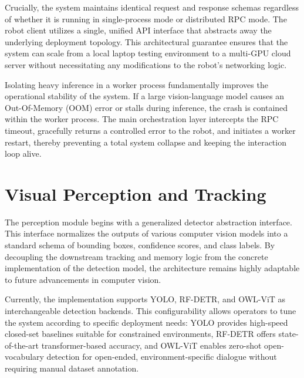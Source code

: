 Crucially, the system maintains identical request and response schemas regardless of whether it is running in single-process mode or distributed RPC mode. The robot client utilizes a single, unified API interface that abstracts away the underlying deployment topology. This architectural guarantee ensures that the system can scale from a local laptop testing environment to a multi-GPU cloud server without necessitating any modifications to the robot's networking logic.

Isolating heavy inference in a worker process fundamentally improves the operational stability of the system. If a large vision-language model causes an Out-Of-Memory (OOM) error or stalls during inference, the crash is contained within the worker process. The main orchestration layer intercepts the RPC timeout, gracefully returns a controlled error to the robot, and initiates a worker restart, thereby preventing a total system collapse and keeping the interaction loop alive.

\section{Visual Perception and Tracking}
\label{sec:perception_tracking}

The perception module begins with a generalized detector abstraction interface. This interface normalizes the outputs of various computer vision models into a standard schema of bounding boxes, confidence scores, and class labels. By decoupling the downstream tracking and memory logic from the concrete implementation of the detection model, the architecture remains highly adaptable to future advancements in computer vision.

Currently, the implementation supports YOLO, RF-DETR, and OWL-ViT as interchangeable detection backends. This configurability allows operators to tune the system according to specific deployment needs: YOLO provides high-speed closed-set baselines suitable for constrained environments, RF-DETR offers state-of-the-art transformer-based accuracy, and OWL-ViT enables zero-shot open-vocabulary detection for open-ended, environment-specific dialogue without requiring manual dataset annotation.

